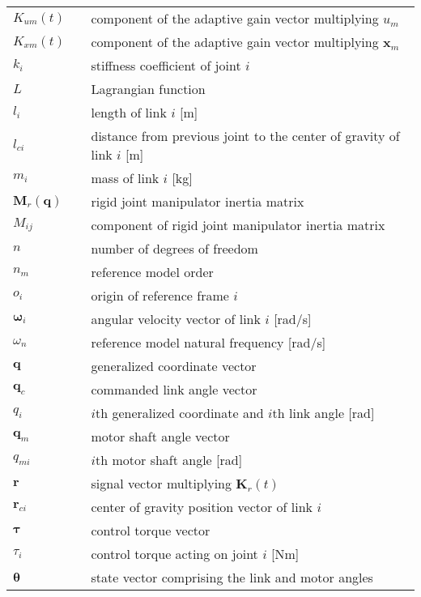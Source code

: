 \begin{longtable}[ht]{lll}
			$K_{um}(t)$											&  & component of the adaptive gain vector multiplying $u_{m}$\\
			$K_{xm}(t)$											&  & component of the adaptive gain vector multiplying $\mathbf{x}_{m}$\\
			$k_{i}$													&  & stiffness coefficient of joint $i$\\
			$L$															&  & Lagrangian function\\
			$l_{i}$													&  & length of link $i$ [m]\\
			$l_{ci}$												&  & distance from previous joint to the center of gravity of link $i$ [m]\\
			$m_{i}$													&  & mass of link $i$ [kg]\\
			$\mathbf{M}_{r}(\mathbf{q})$		&  & rigid joint manipulator inertia matrix\\
			${M}_{ij}$											&  & component of rigid joint manipulator inertia matrix\\
			$n$															&  & number of degrees of freedom\\
			$n_{m}$													&  & reference model order\\
			$o_{i}$													&  & origin of reference frame $i$\\ 
			$\mathbf{\omega}_{i}$						&  & angular velocity vector of link $i$ [rad/s]\\
			$\omega_{n}$										&  & reference model natural frequency [rad/s]\\ 
			$\mathbf{q}$										&  & generalized coordinate vector\\
			$\mathbf{q}_{c}$								&  & commanded link angle vector\\
			$q_{i}$													&  & $i$th generalized coordinate and $i$th link angle [rad]\\
			$\mathbf{q}_{m}$								&  & motor shaft angle vector\\
			$q_{mi}$												&  & $i$th motor shaft angle [rad]\\
			$\mathbf{r}$										&	 & signal vector multiplying $\mathbf{K}_{r}(t)$\\
			$\mathbf{r}_{ci}$								&  & center of gravity position vector of link $i$\\
			$\mathbf{\tau}$									&  & control torque vector\\
			$\tau_{i}$											&  & control torque acting on joint $i$ [Nm]\\
			$\mathbf{\theta}$							  &  & state vector comprising the link and motor angles\\

\end{longtable}
